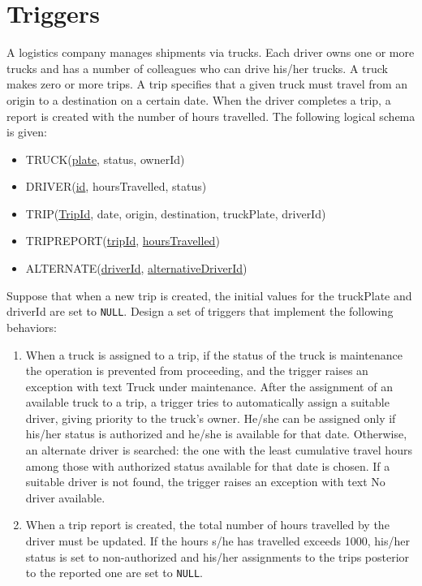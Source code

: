 \section{Triggers}

A logistics company manages shipments via trucks. Each driver owns one or more trucks and has a number of colleagues who can drive his/her trucks. 
A truck makes zero or more trips. 
A trip specifies that a given truck must travel from an origin to a destination on a certain date. 
When the driver completes a trip, a report is created with the number of hours travelled. 
The following logical schema is given:
\begin{itemize}
    \item TRUCK(\underline{plate}, status, ownerId) 
    \item DRIVER(\underline{id}, hoursTravelled, status) 
    \item TRIP(\underline{TripId}, date, origin, destination, truckPlate, driverId)
    \item TRIPREPORT(\underline{tripId}, \underline{hoursTravelled})
    \item ALTERNATE(\underline{driverId}, \underline{alternativeDriverId})
\end{itemize}
Suppose that when a new trip is created, the initial values for the truckPlate and driverId are set to \texttt{NULL}. 
Design a set of triggers that implement the following behaviors: 
\begin{enumerate}
    \item When a truck is assigned to a trip, if the status of the truck is maintenance the operation is prevented from proceeding, and the trigger raises an exception with text Truck under maintenance. 
        After the assignment of an available truck to a trip, a trigger tries to automatically assign a suitable driver, giving priority to the truck's owner. 
        He/she can be assigned only if his/her status is authorized and he/she is available for that date. 
        Otherwise, an alternate driver is searched: the one with the least cumulative travel hours among those with authorized status available for that date is chosen. 
        If a suitable driver is not found, the trigger raises an exception with text No driver available.
    \item When a trip report is created, the total number of hours travelled by the driver must be updated. 
        If the hours s/he has travelled exceeds 1000, his/her status is set to non-authorized and his/her assignments to the trips posterior to the reported one are set to \texttt{NULL}.
\end{enumerate}

